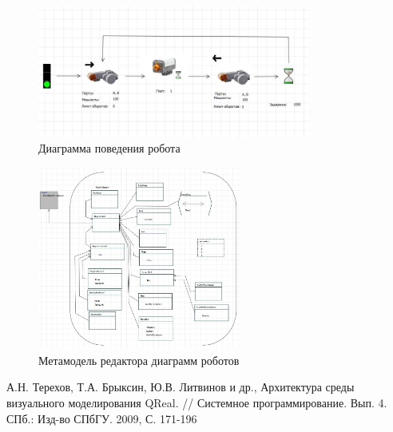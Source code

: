 \documentclass[a4paper]{article}
\begin{document}
\begin{figure} [ht]
  \begin{center}
    \includegraphics[width=0.8\textwidth]{robotsDiagram.jpg}
    \caption{Диаграмма поведения робота}
    \label{robotsDiagram}
  \end{center}
\end{figure}

\begin{figure} [ht]
  \begin{center}
    \includegraphics[width=0.6\textwidth]{robotsMetamodel.jpg}
    \caption{Метамодель редактора диаграмм роботов}
    \label{robotsMetamodel}
  \end{center}
\end{figure}

\begin{thebibliography}{9001}
   А.Н. Терехов, Т.А. Брыксин, Ю.В. Литвинов и др., Архитектура среды визуального моделирования QReal. // Системное программирование. Вып. 4. СПб.: Изд-во СПбГУ. 2009, С. 171-196
\end{thebibliography}
\end{document}
